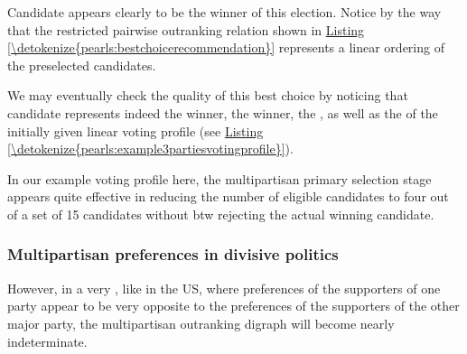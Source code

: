 \documentclass[a4paper,12pt,english]{sphinxhowto}
\begin{document}
\sphinxAtStartPar
Candidate  appears clearly to be the winner of this election. Notice by the way that the restricted pairwise outranking relation shown in \hyperref[\detokenize{pearls:bestchoicerecommendation}]{Listing \ref{\detokenize{pearls:bestchoicerecommendation}}} represents a linear ordering of the preselected candidates.

\sphinxAtStartPar
We may eventually check the quality of this best choice by noticing that candidate  represents indeed the  winner, the  winner, the , as well as the  of the initially given linear voting profile  (see \hyperref[\detokenize{pearls:example3partiesvotingprofile}]{Listing \ref{\detokenize{pearls:example3partiesvotingprofile}}}).
\def\sphinxLiteralBlockLabel{\label{\detokenize{pearls:verificationbestchoice}}}
\begin{sphinxVerbatim}[commandchars=\\\{\},numbers=left,firstnumber=1,stepnumber=1]
   
  
\end{sphinxVerbatim}

\sphinxAtStartPar
In our example voting profile here, the multipartisan primary selection stage appears quite effective in reducing the number of eligible candidates to four out of a set of 15 candidates without btw rejecting the actual winning candidate.


\subsubsection{Multipartisan preferences in divisive politics}
\label{\detokenize{pearls:multipartisan-preferences-in-divisive-politics}}
\sphinxAtStartPar
However, in a very , like in the US, where preferences of the supporters of one party appear to be very opposite to the preferences of the supporters of the other major party, the multipartisan outranking digraph will become nearly indeterminate.
\end{document}
